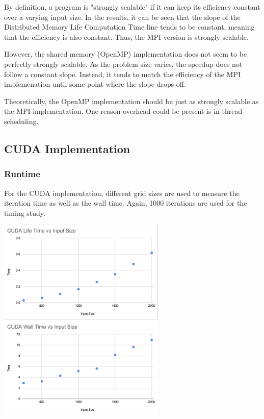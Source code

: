 \documentclass[11pt]{article}
\begin{document}
By definition, a program is "strongly scalable" if it can keep its efficiency constant over a varying input size. In the results, it can be seen that the slope of the Distributed Memory Life Computation Time line tends to be constant, meaning that the efficiency is also constant. Thus, the MPI version is strongly scalable.

However, the shared memory (OpenMP) implementation does not seem to be perfectly strongly scalable. As the problem size varies, the speedup does not follow a constant slope. Instead, it tends to match the efficiency of the MPI implemenation until some point where the slope drops off. 

Theoretically, the OpenMP implementation should be just as strongly scalable as the MPI implementation. One reason overhead could be present is in thread scheduling. 

\subsection{CUDA Implementation}
\label{sec:org31daf97}
\subsubsection{Runtime}
\label{sec:orgb6b22ab}
For the CUDA implementation, different grid sizes are used to measure the iteration time as well as the wall time. Again, 1000 iterations are used for the timing study.

\begin{center}
\includegraphics[width=8cm]{./cuda-times.png}
\end{center}
\end{document}
